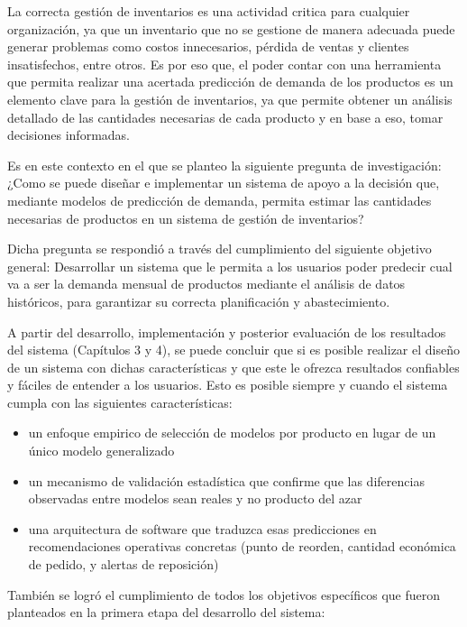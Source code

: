 
La correcta gestión de inventarios es una actividad critica para cualquier organización, ya que un inventario que no se gestione de manera adecuada puede generar problemas como costos innecesarios, pérdida de ventas y clientes insatisfechos, entre otros. Es por eso que, el poder contar con una herramienta que permita realizar una acertada predicción de demanda de los productos es un elemento clave para la gestión de inventarios, ya que permite obtener un análisis detallado de las cantidades necesarias de cada producto y en base a eso, tomar decisiones informadas.

Es en este contexto en el que se planteo la siguiente pregunta de investigación: ¿Como se puede diseñar e implementar un sistema de apoyo a la decisión que, mediante modelos de predicción de demanda, permita estimar las cantidades necesarias de productos en un sistema de gestión de inventarios?

Dicha pregunta se respondió a través del cumplimiento del siguiente objetivo general: Desarrollar un sistema que le permita a los usuarios poder predecir cual va a ser la demanda mensual de productos mediante el análisis de datos históricos, para garantizar su correcta planificación y abastecimiento.

A partir del desarrollo, implementación y posterior evaluación de los resultados del sistema (Capítulos 3 y 4), se puede concluir que si es posible realizar el diseño de un sistema con dichas características y que este le ofrezca resultados confiables y fáciles de entender a los usuarios. Esto es posible siempre y cuando el sistema cumpla con las siguientes características:

\begin{itemize}
    \item un enfoque empirico de selección de modelos por producto en lugar de un único modelo generalizado
    \item un mecanismo de validación estadística que confirme que las diferencias observadas entre modelos sean reales y no producto del azar
    \item una arquitectura de software que traduzca esas predicciones en recomendaciones operativas concretas (punto de reorden, cantidad económica de pedido, y alertas de reposición)
\end{itemize}

También se logró el cumplimiento de todos los objetivos específicos que fueron planteados en la primera etapa del desarrollo del sistema:

